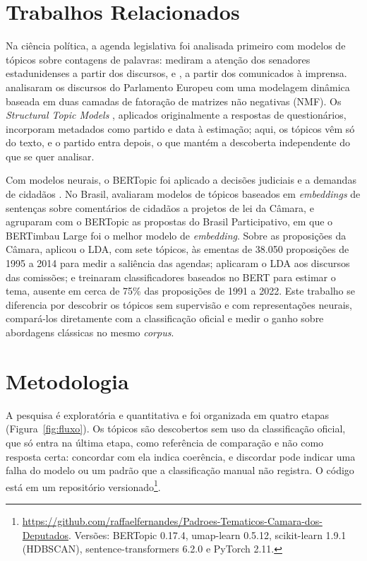\documentclass[12pt]{article}
\begin{document}
\section{Trabalhos Relacionados} \label{sec:firstpage}

Na ciência política, a agenda legislativa foi analisada primeiro com modelos de tópicos sobre contagens de palavras: \citet{quinn2010analyze} mediram a atenção dos senadores estadunidenses a partir dos discursos, e \citet{grimmer2010bayesian}, a partir dos comunicados à imprensa. \citet{greene2017exploring} analisaram os discursos do Parlamento Europeu com uma modelagem dinâmica baseada em duas camadas de fatoração de matrizes não negativas (NMF). Os \textit{Structural Topic Models} \citep{roberts2014structural}, aplicados originalmente a respostas de questionários, incorporam metadados como partido e data à estimação; aqui, os tópicos vêm só do texto, e o partido entra depois, o que mantém a descoberta independente do que se quer analisar.

Com modelos neurais, o BERTopic foi aplicado a decisões judiciais \citep{silveira2021topic} e a demandas de cidadãos \citep{tang2024analyzing}. No Brasil, \citet{silva2021evaluating} avaliaram modelos de tópicos baseados em \textit{embeddings} de sentenças sobre comentários de cidadãos a projetos de lei da Câmara, e \citet{ferreira2025semantic} agruparam com o BERTopic as propostas do Brasil Participativo, em que o BERTimbau Large foi o melhor modelo de \textit{embedding}. Sobre as proposições da Câmara, \citet{batista2020quais} aplicou o LDA, com sete tópicos, às ementas de 38.050 proposições de 1995 a 2014 para medir a saliência das agendas; \citet{santos2023topic} aplicaram o LDA aos discursos das comissões; e \citet{nunes2025legisubjects} treinaram classificadores baseados no BERT para estimar o tema, ausente em cerca de 75\% das proposições de 1991 a 2022. Este trabalho se diferencia por descobrir os tópicos sem supervisão e com representações neurais, compará-los diretamente com a classificação oficial e medir o ganho sobre abordagens clássicas no mesmo \textit{corpus}.

\section{Metodologia}
\label{sec:metodologia}

A pesquisa é exploratória e quantitativa e foi organizada em quatro etapas (Figura~\ref{fig:fluxo}). Os tópicos são descobertos sem uso da classificação oficial, que só entra na última etapa, como referência de comparação e não como resposta certa: concordar com ela indica coerência, e discordar pode indicar uma falha do modelo ou um padrão que a classificação manual não registra. O código está em um repositório versionado\footnote{\url{https://github.com/raffaelfernandes/Padroes-Tematicos-Camara-dos-Deputados}. Versões: BERTopic 0.17.4, umap-learn 0.5.12, scikit-learn 1.9.1 (HDBSCAN), sentence-transformers 6.2.0 e PyTorch 2.11.}.
\end{document}
